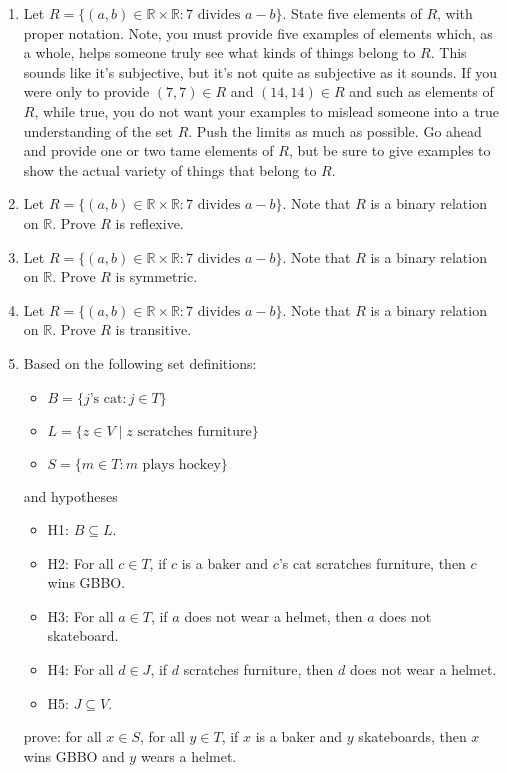 \documentclass{article}
\begin{document}
\begin{enumerate}

\item Let $R = \{(a,b) \in \mathbb{R} \times \mathbb{R} : 7 \text{ divides } a-b\}$. State five elements of $R$, with proper notation. Note, you must provide five examples of elements which, as a whole, helps someone truly see what kinds of things belong to $R$. This sounds like it's subjective, but it's not quite as subjective as it sounds. If you were only to provide $(7,7) \in R$ and $(14,14) \in R$ and such as elements of $R$, while true, you do not want your examples to mislead someone into a true understanding of the set $R$. Push the limits as much as possible. Go ahead and provide one or two tame elements of $R$, but be sure to give examples to show the actual variety of things that belong to $R$.

\item Let $R = \{(a,b) \in \mathbb{R} \times \mathbb{R} : 7 \text{ divides } a-b\}$. Note that $R$ is a binary relation on $\mathbb{R}$. Prove $R$ is reflexive.

\item Let $R = \{(a,b) \in \mathbb{R} \times \mathbb{R} : 7 \text{ divides } a-b\}$. Note that $R$ is a binary relation on $\mathbb{R}$. Prove $R$ is symmetric.

\item Let $R = \{(a,b) \in \mathbb{R} \times \mathbb{R} : 7 \text{ divides } a-b\}$. Note that $R$ is a binary relation on $\mathbb{R}$. Prove $R$ is transitive.

\item Based on the following set definitions:
\begin{itemize}
\item $B = \{ j\text{'s cat} : j \in T \}$
\item $L = \{ z \in V \mid z \text{ scratches furniture} \}$
\item $S = \{ m \in T : m \text{ plays hockey} \}$
\end{itemize}
and hypotheses
\begin{itemize}
\item H1: $B \subseteq L$.
\item H2: For all $c \in T$, if $c$ is a baker and $c$'s cat scratches furniture, then $c$ wins GBBO.\@
\item H3: For all $a \in T$, if $a$ does not wear a helmet, then $a$ does not skateboard.
\item H4: For all $d \in J$, if $d$ scratches furniture, then $d$ does not wear a helmet.
\item H5: $J \subseteq V$.
\end{itemize}
prove: for all $x \in S$, for all $y \in T$, if $x$ is a baker and $y$ skateboards, then $x$ wins GBBO and $y$ wears a helmet.

\end{enumerate}
\end{document}
